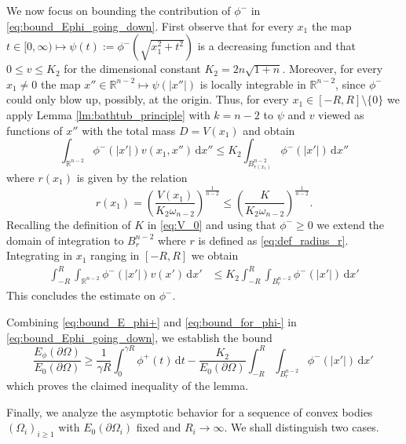 \documentclass[10pt,leqno]{amsart}
\makeatletter
\newcommand{\R}[0]{\mathbb{R}}
\newcommand{\p}{\partial}
\newcommand{\dd}{\, \mathrm{d}}
\numberwithin{Theorem}{section}
\theoremstyle{definition}
\theoremstyle{remark}
\numberwithin{equation}{section}
\numberwithin{equation}{section}
\newenvironment{customproof}[1]{%
  \par\pushQED{\qed}%
  \normalfont\topsep6pt \trivlist
  \item[\hskip\labelsep\itshape
    Proof of #1\@addpunct{.}]\ignorespaces
}{%
  \popQED\endtrivlist\@endpefalse
}
\makeatother
\begin{document}
\begin{customproof}{Lemma \ref{lm:bound_on_max_radius_decreasing}}
We now focus on bounding the contribution of $\phi^-$ in \eqref{eq:bound_Ephi_going_down}. First observe that for every $x_1$ the map
 $t\in[0,\infty)\mapsto \psi(t):=\phi^-(\sqrt{x_1^2+t^2})$ is a decreasing function
and that $0\leq v \leq K_2$ for the dimensional constant $K_2=2n\sqrt{1+n}$. 
Moreover, for every $x_1\neq 0$ the map $x''\in\R^{n-2}\mapsto \psi(|x''|)$ is locally integrable in $\R^{n-2}$, since $\phi^-$ could only blow up, possibly, at the origin.
Thus, for every $x_1 \in [-R,R]\setminus \{0\}$
we apply Lemma  \ref{lm:bathtub_principle} with $k=n-2$ to $\psi$ and $v$ viewed as functions of $x''$ with the total mass $D=V(x_1)$ and obtain
\begin{equation*}
\int_{\R^{n-2}} \phi^-(|x'|) v(x_1, x'') \dd x'' \leq K_2 \int_{B_{r(x_1)}^{n-2}} \phi^-(|x'|) \dd x''
\end{equation*}
where $r(x_1)$ is given by the relation
\[
r(x_1)=\left( \frac{V(x_1)}{K_2\omega_{n-2}}\right)^{\frac{1}{n-2}} \leq \left( \frac{K}{K_2 \omega_{n-2}}\right)^{\frac{1}{n-2}}.
\]
Recalling the definition of $K$ in \eqref{eq:V_0} and using that $\phi^-\geq 0$ we extend the domain of integration to $B^{n-2}_{r}$ where $r$ is defined as \eqref{eq:def_radius_r}. Integrating in $x_1$ ranging in $[-R,R]$ we obtain
\begin{equation}\label{eq:bound_for_phi-}
\begin{aligned}
    \int_{-R}^{R} \int_{\R^{n-2}} \phi^-(|x'|) v(x') \dd x' &\leq K_2 \int_{-R}^{R} \int_{B^{n-2}_{r}} \phi^-(|x'|) \dd x' 
\end{aligned}
\end{equation}
This concludes the estimate on $\phi^-$.

Combining \eqref{eq:bound_E_phi+}  and \eqref{eq:bound_for_phi-} in \eqref{eq:bound_Ephi_going_down}, we establish the bound  
\begin{equation} \label{eq:bound_Ephi_by_R_inc1}
\frac{E_{\phi}(\p \Omega)}{E_0(\p \Omega)} \geq \frac{1}{\gamma R} \int_0^{\gamma R} \phi^+(t) \dd t - \frac{K_2}{E_0(\p \Omega)} \int_{-R}^R \int_{B^{n-2}_{r}} \phi^-(|x'|) \dd x'\,
\end{equation}
which proves the claimed inequality of the lemma. 

\smallskip



Finally, we analyze the asymptotic behavior for a sequence of convex bodies $(\Omega_i)_{i\geq 1}$ with $E_0(\p \Omega_i)$ fixed and $R_i \to \infty$. We shall distinguish two cases. 


\end{customproof}
\end{document}
